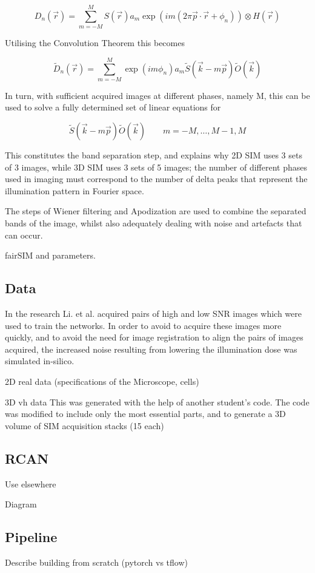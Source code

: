 \documentclass[12pt]{article}
\begin{document}
\[D_n(\vec{r}) = \sum_{m=-M}^{M}{S(\vec{r})a_m\exp(im(2\pi\vec{p}\cdot\vec{r}+\phi_n))\otimes H(\vec{r})}\]

Utilising the Convolution Theorem this becomes

\[\tilde{D}_n(\vec{r}) = \sum_{m=-M}^{M}{\exp(im\phi_n)a_m\tilde{S}(\vec{k}-m\vec{p})\tilde{O}(\vec{k})}\]

In turn, with sufficient acquired images at different phases, namely M, this can be used to solve a fully determined set of linear equations for

\[\tilde{S}(\vec{k}-m\vec{p})\tilde{O}(\vec{k})\qquad m=-M,\dots,M-1,M\]

This constitutes the band separation step, and explains why 2D SIM uses 3 sets of 3 images, while 3D SIM uses 3 sets of 5 images;
the number of different phases used in imaging must correspond to the number of delta peaks that represent the illumination pattern in Fourier space.

The steps of Wiener filtering and Apodization are used to combine the separated bands of the image,
whilst also adequately dealing with noise and artefacts that can occur.

fairSIM and parameters.

\subsection{Data}

In the research Li. et al. acquired pairs of high and low SNR images which were used to train the networks.
In order to avoid to acquire these images more quickly, and to avoid the need for image registration to align the pairs of images acquired,
the increased noise resulting from lowering the illumination dose was simulated in-silico.

2D real data (specifications of the Microscope, cells)

3D vh data
This was generated with the help of another student's code.
The code was modified to include only the most essential parts, and to generate a 3D volume of SIM acquisition stacks (15 each)

\subsection{RCAN}
Use elsewhere

Diagram

\subsection{Pipeline}
Describe building from scratch (pytorch vs tflow)
\end{document}
